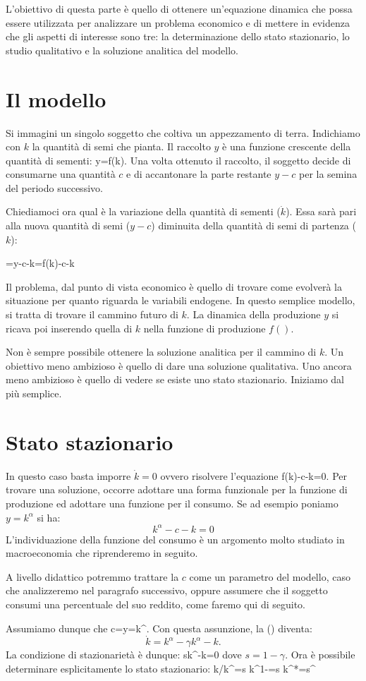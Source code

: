 L'obiettivo di questa parte \`e quello di ottenere un'equazione dinamica che possa essere utilizzata per analizzare un problema economico e di mettere in evidenza che gli aspetti di interesse sono tre: la determinazione dello stato stazionario, lo studio qualitativo e la soluzione analitica del modello.
\section{Il modello}
Si immagini un singolo soggetto che coltiva un appezzamento di terra. Indichiamo con $k$ la quantit\`a di semi che pianta. Il raccolto $y$ \`e una funzione crescente della quantit\`a di sementi:
\startformula
y=f(k).
\stopformula
Una volta ottenuto il raccolto, il soggetto decide di consumarne una quantit\`a $c$ e di 
accantonare la parte restante $y-c$ per la semina del periodo successivo.

Chiediamoci ora qual \`e la variazione della quantit\`a di sementi ($\dot{k}$). Essa sar\`a pari alla nuova quantità di semi ($y-c$) diminuita della quantità di semi di partenza ($k$):

\startformula
{}=y-c-k=f(k)-c-k
\stopformula

Il problema, dal punto di vista economico \`e quello di trovare come evolver\`a la situazione per quanto riguarda le variabili endogene. In questo semplice modello, si tratta di trovare il cammino futuro di $k$. La dinamica della produzione $y$ si ricava poi inserendo quella di $k$ nella funzione di produzione $f()$.

Non \`e sempre possibile ottenere la soluzione analitica per il cammino di $k$. Un obiettivo meno ambizioso \`e quello di dare una soluzione qualitativa. Uno ancora meno ambizioso \`e quello di vedere se esiste uno stato stazionario.
Iniziamo dal pi\`u semplice.

\section{Stato stazionario}
In questo caso basta imporre $\dot{k}=0$ ovvero risolvere l'equazione
\startformula f(k)-c-k=0.\stopformula 
Per trovare una soluzione, occorre adottare una forma funzionale per la funzione di produzione ed adottare una funzione per il consumo. 
Se ad esempio poniamo $y=k^{\alpha}$ si ha:
\placeformula[eq:c_param]$$k^\alpha -c-k=0$$
L'individuazione della funzione del consumo è un argomento molto studiato in macroeconomia che riprenderemo in seguito. 

A livello didattico potremmo trattare la $c$ come un parametro del modello, caso che analizzeremo nel paragrafo successivo, oppure assumere che il soggetto consumi una percentuale del suo reddito, come faremo qui di seguito. 

Assumiamo dunque che 
\startformula c=\gamma y=\gamma k^\alpha.\stopformula  
Con questa assunzione, la (\in[eq:c_param]) diventa:
\placeformula[eq:c_gy]$$\dot{k}=k^\alpha-\gamma k^\alpha -k.$$
La condizione di stazionariet\`a è dunque:
\startformula sk^\alpha-k=0\stopformula 
dove $s=1-\gamma$. Ora \`e possibile determinare esplicitamente lo stato stazionario:
\startformula 
k/k^{\alpha}=s \Rightarrow k^{1-\alpha}=s \Rightarrow k^*=s^{} 
\stopformula 
